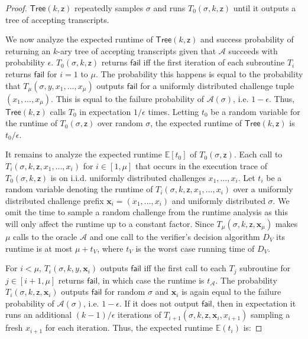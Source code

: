 \documentclass{article}
\theoremstyle{definition}
\begin{document}
\begin{proof}
$\textsf{Tree}(k, \mathsf{z})$ repeatedly samples $\sigma$ and runs $T_0(\sigma, k,\mathsf{z})$ until it outputs a tree of accepting transcripts.

We now analyze the expected runtime of $\mathsf{Tree}(k, \mathsf{z})$ and success probability of returning an $k$-ary tree of accepting transcripts given that $\mathcal{A}$ succeeds with probability $\epsilon$. $T_0(\sigma,k, \mathsf{z})$ returns $\mathsf{fail}$ iff the first iteration of each subroutine $T_i$ returns $\mathsf{fail}$ for $i = 1$ to $\mu$. The probability this happens is equal to the probability that $T_\mu(\sigma, y, x_1,...,x_\mu)$ outputs $\mathsf{fail}$ for a uniformly distributed challenge tuple $(x_1,...,x_\mu)$. This is equal to the failure probability of $\mathcal{A}(\sigma)$, i.e. $1 - \epsilon$. Thus, $\mathsf{Tree}(k, \mathsf{z})$ calls $T_0$ in expectation $1/\epsilon$ times. Letting $t_0$ be a random variable for the runtime of $T_0(\sigma, \mathsf{z})$ over random $\sigma$, the expected runtime of $\mathsf{Tree}(k, \mathsf{z})$ is $t_0/\epsilon$. 


It remains to analyze the expected runtime $\mathbb{E}[t_0]$ of $T_0(\sigma, \mathsf{z})$. Each call to $T_i(\sigma, k, \mathsf{z}, x_1,...,x_i)$ for $i \in [1,\mu]$ that occurs in the execution trace of $T_0(\sigma, k, \mathsf{z})$ is on i.i.d. uniformly distributed challenges $x_1,...,x_i$. Let $t_i$ be a random variable denoting the runtime of $T_i(\sigma, k, \mathsf{z}, x_1,...,x_i)$ over a uniformly distributed challenge prefix $\mathbf{x}_i = (x_1,...,x_i)$ and uniformly distributed $\sigma$. We omit the time to sample a random challenge from the runtime analysis as this will only affect the runtime up to a constant factor. Since $T_\mu(\sigma, k, \mathsf{z}, \mathbf{x}_\mu)$ makes $\mu$ calls to the oracle $\mathcal{A}$ and one call to the verifier's decision algorithm $D_V$ its runtime is at most $\mu + t_V$, where $t_V$ is the worst case running time of $D_V$.  

For $i < \mu$, $T_i(\sigma, k,y, \mathbf{x}_i)$ outputs $\mathsf{fail}$ iff the first call to each $T_{j}$ subroutine for $j \in [i+1,\mu]$ returns $\mathsf{fail}$, in which case the runtime is $t_\mathcal{A}$. The probability $T_i(\sigma, k, \mathsf{z}, \mathbf{x}_i)$ outputs $\mathsf{fail}$ for random $\sigma$ and $\mathbf{x}_i$ is again equal to the failure probability of $\mathcal{A}(\sigma)$, i.e. $1 - \epsilon$. If it does not output $\mathsf{fail}$, then in expectation it runs an additional $(k-1)/\epsilon$ iterations of $T_{i+1}(\sigma, k, \mathsf{z}, \mathbf{x}_i, x_{i+1})$ sampling a fresh $x_{i+1}$ for each iteration. Thus, the expected runtime $\mathbb{E}(t_i)$ is: 


\end{proof}
\end{document}
